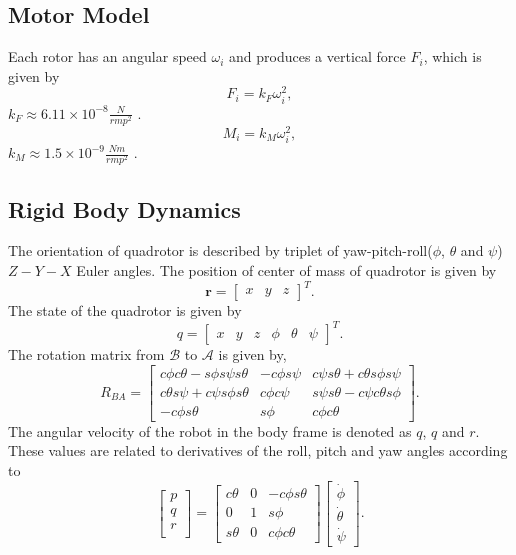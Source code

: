 \documentclass[conference,onecolumn,10pt]{IEEEtran}
\begin{document}
\subsection{Motor Model}
Each rotor has an angular speed $\omega_i$ and produces a vertical force $F_i$, which is given by 
\begin{equation}
\label{Fi}
F_i = k_F\omega_i^2,
\end{equation}
$k_F \approx 6.11\times10^{-8} \frac{N}{rmp^2}$ \cite{michael2010grasp}.
\begin{equation}
\label{Mi}
M_i = k_M\omega_i^2,
\end{equation}
$k_M \approx 1.5\times10^{-9} \frac{Nm}{rmp^2}$ \cite{michael2010grasp}.
\subsection{Rigid Body Dynamics}
The orientation of quadrotor is described by triplet of yaw-pitch-roll($\phi$, $\theta$ and $\psi$) $Z-Y-X$ Euler angles. The position of center of mass of quadrotor is given by 
\begin{equation}
\textbf{r} = \begin{bmatrix}
x&y&z
\end{bmatrix}^T.
\end{equation}
The state of the quadrotor is given by 
\begin{equation}
q = \begin{bmatrix}
x & y & z & \phi & \theta & \psi 
\end{bmatrix}^T.
\end{equation}
The rotation matrix from $\mathcal{B}$ to $\mathcal{A}$ is given by, 
\begin{equation}
\label{Rot}
R_{BA} = \begin{bmatrix}
c\phi c\theta-s\phi s\psi s\theta & -c\phi s\psi & c\psi s\theta + c \theta s \phi s \psi \\
c \theta s \psi + c \psi s \phi s \theta & c \phi c \psi & s \psi s \theta -c \psi c \theta s \phi \\
-c \phi s \theta & s \phi & c \phi c \theta 
\end{bmatrix}.
 \end{equation}
 The angular velocity of the robot in the body frame is denoted as $q$, $q$ and $r$. These values are related to derivatives of the roll, pitch and yaw angles according to 
 \begin{equation}
 \label{pqr}
 \begin{bmatrix}
 p\\
 q\\
 r\\
 \end{bmatrix} = \begin{bmatrix}
 c\theta & 0 & -c\phi s \theta \\
 0 & 1 & s \phi \\
 s \theta & 0 & c \phi c \theta 
 \end{bmatrix} \begin{bmatrix}
 \dot{\phi}\\
 \dot{\theta}\\
 \dot{\psi}
 \end{bmatrix}.
 \end{equation}
\end{document}
